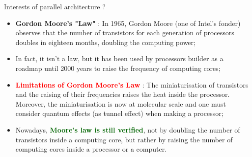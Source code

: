 \documentclass[compress,10pt,aspectratio=169]{beamer}
\begin{document}
\begin{frame}[fragile]{Interests of parallel architecture ?}
    \small
    \begin{itemize}
        \item \textbf{\textcolor{NavyBlue}{Gordon Moore's "Law"}} : In 1965, Gordon Moore (one of Intel's fonder) observes that the number of transistors
              for each generation of processors doubles in eighteen months, doubling the computing power;
        \item In fact, \alert{it isn't a law}, but it has been used by processors builder as a roadmap until 2000 years to raise the frequency
              of computing cores;
        \item \textbf{\textcolor{red}{Limitations of Gordon Moore's Law}} : The miniaturisation of transistors and the raising of their
              frequencies raises the heat inside the processor. Moreover, the miniaturisation is now at molecular scale and one must
              consider quantum effects (as tunnel effect) when making a processor;
        \item Nowadays, \textbf{\textcolor{DarkGreen}{Moore's law is still verified}}, not by doubling the number of transistors 
              inside a computing core, but rather by raising the number of computing cores inside a processor or a computer.
    \end{itemize}
\end{frame}
\end{document}
